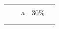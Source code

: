 \begin{table}[H]
\begin{tabular*}{\columnwidth}{@{\extracolsep{\fill}}clcrl}
                                           &                                                                                                            &            &                  &                                                                                                                                                                                                                                                                                                                                                                                                                                                                           \\
                                           &                                                                                                            & a          & 30\%             &                                                                                                                                                                                                                                                                                                                                                                                                                                                                           \\
                                           &                                                                                                            &            &                  &                                                                                                                                                                                                                                                                                                                                                                                                                                                                           \\
                                           &                                                                                                            &            &                  &                                                                                                                                                                                                                                                                                                                                                                                                                                                                           \\

\end{tabular*}
\end{table}
